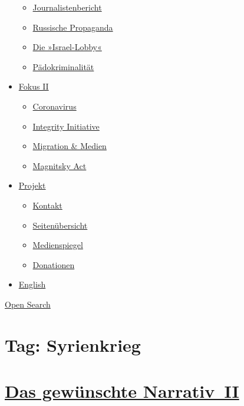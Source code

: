 \begin{itemize}
  \begin{itemize}
  \tightlist
  \item
    \href{https://swprs.org/bericht-eines-journalisten/}{Journalistenbericht}
  \item
    \href{https://swprs.org/russische-propaganda/}{Russische Propaganda}
  \item
    \href{https://swprs.org/die-israel-lobby-fakten-und-mythen/}{Die
    »Israel-Lobby«}
  \item
    \href{https://swprs.org/geopolitik-und-paedokriminalitaet/}{Pädokriminalität}
  \end{itemize}
\item
  \href{https://swprs.org/migration-und-medien/}{Fokus II}

  \begin{itemize}
  \tightlist
  \item
    \href{https://swprs.org/covid-19-hinweis-ii/}{Coronavirus}
  \item
    \href{https://swprs.org/die-integrity-initiative/}{Integrity
    Initiative}
  \item
    \href{https://swprs.org/migration-und-medien/}{Migration \& Medien}
  \item
    \href{https://swprs.org/der-fall-magnitsky/}{Magnitsky Act}
  \end{itemize}
\item
  \href{https://swprs.org/kontakt/}{Projekt}

  \begin{itemize}
  \tightlist
  \item
    \href{https://swprs.org/kontakt/}{Kontakt}
  \item
    \href{https://swprs.org/uebersicht/}{Seitenübersicht}
  \item
    \href{https://swprs.org/medienspiegel/}{Medienspiegel}
  \item
    \href{https://swprs.org/donationen/}{Donationen}
  \end{itemize}
\item
  \href{https://swprs.org/contact/}{English}
\end{itemize}

\protect\hyperlink{}{Open Search}

\hypertarget{tag-syrienkrieg}{%
\section{Tag: Syrienkrieg}\label{tag-syrienkrieg}}

\hypertarget{das-gewuxfcnschte-narrativ-ii}{%
\section{\texorpdfstring{\href{https://swprs.org/2017/03/01/das-gewuenschte-narrativ-ii/}{Das
gewünschte
Narrativ~II}}{Das gewünschte Narrativ~II}}\label{das-gewuxfcnschte-narrativ-ii}}

